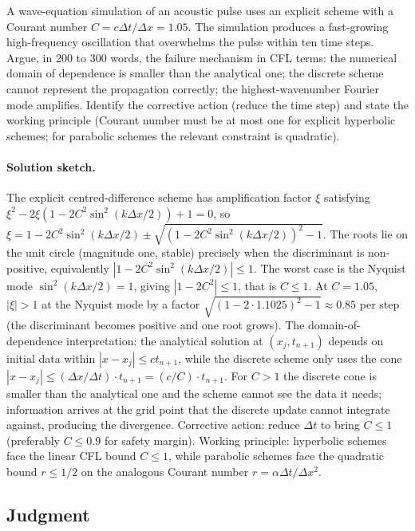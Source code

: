 \begin{exercise}
A wave-equation simulation of an acoustic pulse uses an explicit
scheme with a Courant number $C = c \Delta t/\Delta x = 1.05$.
The simulation produces a fast-growing high-frequency oscillation
that overwhelms the pulse within ten time steps. Argue, in
200 to 300 words, the failure mechanism in CFL terms: the
numerical domain of dependence is smaller than the analytical
one; the discrete scheme cannot represent the propagation
correctly; the highest-wavenumber Fourier mode amplifies. Identify
the corrective action (reduce the time step) and state the
working principle (Courant number must be at most one for
explicit hyperbolic schemes; for parabolic schemes the relevant
constraint is quadratic).

\paragraph{Solution sketch.}
The explicit centred-difference scheme has amplification factor
$\xi$ satisfying $\xi^{2} - 2 \xi(1 - 2 C^{2}\sin^{2}(k\Delta x/2))
+ 1 = 0$, so $\xi = 1 - 2 C^{2}\sin^{2}(k\Delta x/2) \pm
\sqrt{(1 - 2 C^{2}\sin^{2}(k\Delta x/2))^{2} - 1}$. The roots
lie on the unit circle (magnitude one, stable) precisely when the
discriminant is non-positive, equivalently $|1 - 2 C^{2}\sin^{2}
(k\Delta x/2)| \leq 1$. The worst case is the Nyquist mode
$\sin^{2}(k\Delta x/2) = 1$, giving $|1 - 2 C^{2}| \leq 1$, that
is $C \leq 1$. At $C = 1.05$, $|\xi| > 1$ at the Nyquist mode by
a factor $\sqrt{(1 - 2 \cdot 1.1025)^{2} - 1} \approx 0.85$ per
step (the discriminant becomes positive and one root grows). The
domain-of-dependence interpretation: the analytical solution at
$(x_{j}, t_{n+1})$ depends on initial data within $|x - x_{j}|
\leq c t_{n+1}$, while the discrete scheme only uses the cone
$|x - x_{j}| \leq (\Delta x/\Delta t) \cdot t_{n+1} = (c/C) \cdot
t_{n+1}$. For $C > 1$ the discrete cone is smaller than the
analytical one and the scheme cannot see the data it needs;
information arrives at the grid point that the discrete update
cannot integrate against, producing the divergence. Corrective
action: reduce $\Delta t$ to bring $C \leq 1$ (preferably
$C \leq 0.9$ for safety margin). Working principle: hyperbolic
schemes face the linear CFL bound $C \leq 1$, while parabolic
schemes face the quadratic bound $r \leq 1/2$ on the analogous
Courant number $r = \alpha \Delta t/\Delta x^{2}$.
\end{exercise}

\subsection*{Judgment}

